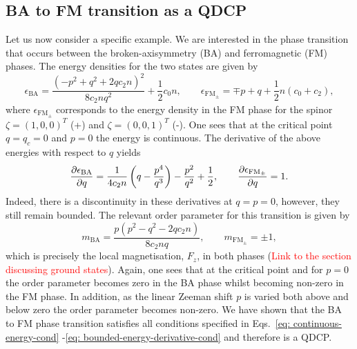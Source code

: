 \subsection{BA to FM transition as a QDCP}
Let us now consider a specific example.
We are interested in the phase transition that occurs between the
broken-axisymmetry (BA) and ferromagnetic (FM) phases.
The energy densities for the two states are given by~\cite{Kawaguchi2012}
\begin{equation}
    \epsilon_\mathrm{BA} = \frac{{(-p^2 + q^2 +2qc_2n)}^2}{8c_2nq^2}
    + \frac{1}{2}c_0n, \qquad
    \epsilon_\mathrm{FM_{\pm}} = \mp p + q + \frac{1}{2}n(c_0 + c_2),
\end{equation}
where \( \epsilon_\mathrm{FM_{\pm}} \) corresponds to the energy density in the
FM phase for the spinor \( \zeta = {(1, 0, 0)}^T \) (+) and
\( \zeta = {(0, 0, 1)}^T \) (-).
One sees that at the critical point \( q=q_c=0 \) and \( p=0 \) the energy is
continuous.
The derivative of the above energies with respect to \( q \) yields
\begin{equation}
    \pdv{\epsilon_\mathrm{BA}}{q} =
    \frac{1}{4c_2n}\left(q - \frac{p^4}{q^3}\right) - \frac{p^2}{q^2}
    + \frac{1}{2},
    \qquad
    \pdv{\epsilon_\mathrm{FM_{\pm}}}{q} = 1.
\end{equation}
Indeed, there is a discontinuity in these derivatives at \( q=p=0 \), however,
they still remain bounded.
The relevant order parameter for this transition is given by
\begin{equation}
    m_\mathrm{BA} = \frac{p(p^2 - q^2 - 2qc_2n)}{8c_2nq},
    \qquad
    m_{\mathrm{FM}_{\pm}} = \pm 1,
\end{equation}
which is precisely the local magnetisation, \( F_z \), in both phases
(\textcolor{red}{Link to the section discussing ground states}).
Again, one sees that at the critical point and for \( p=0 \) the order parameter
becomes zero in the BA phase whilst becoming non-zero in the FM phase.
In addition, as the linear Zeeman shift \( p \) is varied both above and below
zero the order parameter becomes non-zero.
We have shown that the BA to FM phase transition satisfies all conditions
specified in Eqs.~\eqref{eq: continuous-energy-cond}
-\eqref{eq: bounded-energy-derivative-cond}
and therefore is a QDCP\@.

